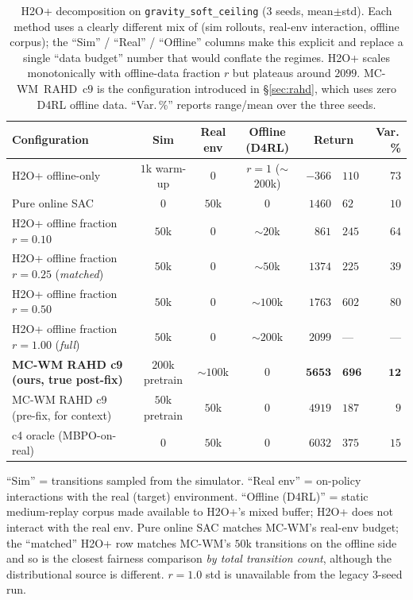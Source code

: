 \documentclass{article}
\theoremstyle{definition}
\begin{document}
\begin{table}[h]
\caption{H2O+ decomposition on \texttt{gravity\_soft\_ceiling}
(3 seeds, mean$\pm$std).  Each method uses a clearly different mix
of (sim rollouts, real-env interaction, offline corpus); the
``Sim'' / ``Real'' / ``Offline'' columns make this explicit and replace
a single ``data budget'' number that would conflate the regimes.
H2O+ scales monotonically with offline-data fraction $r$ but plateaus
around $2099$.  MC-WM~RAHD~c$9$ is the configuration introduced in
\S\ref{sec:rahd}, which uses zero D4RL offline data.  ``Var.\,\%''
reports range/mean over the three seeds.}
\label{tab:h2o_decomp}
\centering
\small
\begin{tabular}{l|c|c|c|r@{\,$\pm$\,}l|r}
\toprule
Configuration                                    & Sim   & Real env & Offline (D4RL) & \multicolumn{2}{c|}{Return} & Var.\,\%        \\
\midrule
H2O+ offline-only                                & $1$k warm-up & 0 & $r=1$ ($\sim$200k) & $-366$  & $110$ & $73$            \\
Pure online SAC                                  & 0          & $50$k     & 0                  & $1460$  & $62$  & $10$            \\
H2O+ offline fraction $r=0.10$                   & $50$k      & 0         & $\sim 20$k         & $861$   & $245$ & $64$            \\
H2O+ offline fraction $r=0.25$ (\textit{matched}) & $50$k     & 0         & $\sim 50$k         & $1374$  & $225$ & $39$            \\
H2O+ offline fraction $r=0.50$                   & $50$k      & 0         & $\sim 100$k        & $1763$  & $602$ & $80$            \\
H2O+ offline fraction $r=1.00$ (\textit{full})   & $50$k      & 0         & $\sim 200$k        & $2099$  & ---   & ---             \\
\midrule
\textbf{MC-WM RAHD c9 (ours, true post-fix)}     & $200$k pretrain & $\sim\!100$k & 0                  & $\mathbf{5653}$ & $\mathbf{696}$ & $\mathbf{12}$ \\
MC-WM RAHD c9 (pre-fix, for context)             & $50$k pretrain & $50$k & 0                  & $4919$ & $187$ & $9$ \\
c4 oracle (MBPO-on-real)                         & 0          & $50$k     & 0                  & $6032$  & $375$ & $15$            \\
\bottomrule
\end{tabular}
\par\smallskip
\footnotesize
``Sim'' = transitions sampled from the simulator. ``Real env'' =
on-policy interactions with the real (target) environment.  ``Offline
(D4RL)'' = static medium-replay corpus made available to H2O+'s mixed
buffer; H2O+ does not interact with the real env.  Pure online SAC
matches MC-WM's real-env budget; the ``matched'' H2O+ row matches
MC-WM's $50$k transitions on the offline side and so is the closest
fairness comparison \emph{by total transition count}, although the
distributional source is different.  $r=1.0$ std is unavailable from
the legacy 3-seed run.
\end{table}
\end{document}
